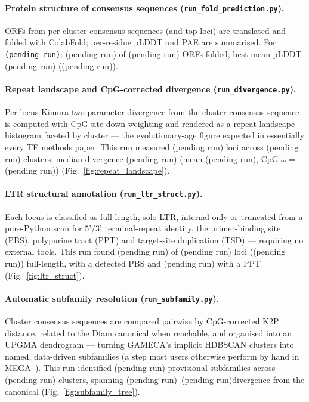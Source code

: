 \documentclass[11pt]{article}
\providecommand{\foldFamily}{(pending run)}\providecommand{\foldNOrfs}{(pending run)}
\providecommand{\foldNFolded}{(pending run)}\providecommand{\foldBestName}{(pending run)}
\providecommand{\foldBestMeanPlddt}{(pending run)}\providecommand{\foldMeanPlddtAll}{(pending run)}
\providecommand{\divNloci}{(pending run)}\providecommand{\divNClusters}{(pending run)}
\providecommand{\divMedianAll}{(pending run)}\providecommand{\divMeanAll}{(pending run)}
\providecommand{\divCpgOmega}{(pending run)}
\providecommand{\ltrNloci}{(pending run)}\providecommand{\ltrNfull}{(pending run)}
\providecommand{\ltrNppt}{(pending run)}\providecommand{\ltrPctFull}{(pending run)}
\providecommand{\subfamNClusters}{(pending run)}\providecommand{\subfamNSubfamilies}{(pending run)}
\providecommand{\subfamMinDiv}{(pending run)}\providecommand{\subfamMaxDiv}{(pending run)}
\begin{document}
\paragraph{Protein structure of consensus sequences (\texttt{run\_fold\_prediction.py}).}
ORFs from per-cluster consensus sequences (and top loci) are translated and folded
with ColabFold; per-residue pLDDT and PAE are summarised. For \texttt{\foldFamily}:
\foldNFolded{} of \foldNOrfs{} ORFs folded, best mean pLDDT \foldBestMeanPlddt{}
(\foldBestName).

\paragraph{Repeat landscape and CpG-corrected divergence (\texttt{run\_divergence.py}).}
Per-locus Kimura two-parameter divergence from the cluster consensus sequence is computed
with CpG-site down-weighting and rendered as a repeat-landscape histogram faceted by
cluster --- the evolutionary-age figure expected in essentially every TE methods paper.
This run measured \divNloci{} loci across \divNClusters{} clusters, median divergence
\divMedianAll{} (mean \divMeanAll, CpG $\omega=$\divCpgOmega)
(Fig.~\ref{fig:repeat_landscape}).

\paragraph{LTR structural annotation (\texttt{run\_ltr\_struct.py}).}
Each locus is classified as full-length, solo-LTR, internal-only or truncated from a
pure-Python scan for 5'/3' terminal-repeat identity, the primer-binding site (PBS),
polypurine tract (PPT) and target-site duplication (TSD) --- requiring no external tools.
This run found \ltrNfull{} of \ltrNloci{} loci (\ltrPctFull) full-length, \ltrNpbs{} with a
detected PBS and \ltrNppt{} with a PPT (Fig.~\ref{fig:ltr_struct}).

\paragraph{Automatic subfamily resolution (\texttt{run\_subfamily.py}).}
Cluster consensus sequences are compared pairwise by CpG-corrected K2P distance, related to
the Dfam canonical when reachable, and organised into an UPGMA dendrogram --- turning
GAMECA's implicit HDBSCAN clusters into named, data-driven subfamilies (a step most users
otherwise perform by hand in MEGA~\citep{tamura2021mega}). This run identified
\subfamNSubfamilies{} provisional subfamilies across \subfamNClusters{} clusters, spanning
\subfamMinDiv--\subfamMaxDiv divergence from the canonical (Fig.~\ref{fig:subfamily_tree}).
\end{document}
